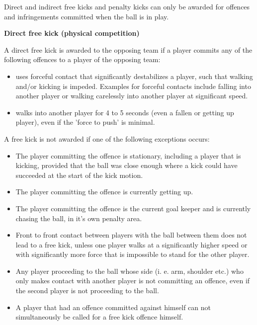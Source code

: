 \clearpage
\sffamily
{\bfseries\color[rgb]{0.4,0.4,0.4}{Law 12 -- Fouls and Misconduct} }
{}

\bigskip

Direct and indirect free kicks and penalty kicks can only be awarded for
offences and infringements committed when the ball is in play.

\bigskip

{\bfseries Direct free kick (physical competition)}

\headlinebox

A direct free kick is awarded to the opposing team if a player commits
any of the following offences to a player of the opposing team:
\begin{itemize}
\item uses forceful contact that significantly destabilizes a player, such
    that walking and/or kicking is impeded. Examples for forceful contacts
    include falling into another player or walking carelessly into another
    player at significant speed.
\item walks into another player for 4 to 5 seconds (even a fallen or
    getting up player), even if the 'force to push' is minimal.
\end{itemize}


A free kick is not awarded if one of the following exceptions occurs: 
\begin{itemize}
\item The player committing the offence is stationary, including a player that is kicking, provided that the ball was close enough where a kick could have succeeded at the start of the kick motion.
\item The player committing the offence is currently getting up.
\item The player committing the offence is the current goal keeper and is currently  chasing the ball, in it's own penalty area.
\item Front to front contact between players with the ball between them does not lead to a free kick, unless one player walks at a significantly higher speed or with significantly more force that is impossible to stand for the other player.
\item Any player proceeding to the ball whose side (i. e. arm, shoulder etc.) who only  makes contact with another player is not committing an offence, even if the second player is not proceeding to the ball.
\item A player that had an offence committed against himself can not simultaneously be called for a free kick offence himself.
\end{itemize}


